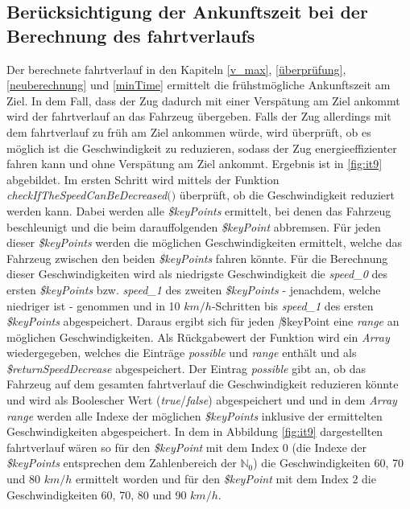 \subsection{Berücksichtigung der Ankunftszeit bei der Berechnung des \Gls{fahrtverlauf}s} \label{time}
Der berechnete \Gls{fahrtverlauf} in den Kapiteln \ref{v_max}, \ref{überprüfung}, \ref{neuberechnung} und \ref{minTime} ermittelt die frühstmögliche Ankunftszeit am Ziel. In dem Fall, dass der Zug dadurch mit einer Verspätung am Ziel ankommt wird der \Gls{fahrtverlauf} an das Fahrzeug übergeben. Falls der Zug allerdings mit dem \Gls{fahrtverlauf} zu früh am Ziel ankommen würde, wird überprüft, ob es möglich ist die Geschwindigkeit zu reduzieren, sodass der Zug energieeffizienter fahren kann und ohne Verspätung am Ziel ankommt.
Ergebnis ist in \ref{fig:it9} abgebildet.
Im ersten Schritt wird mittels der Funktion \textit{checkIfTheSpeedCanBeDecreased$($$)$} überprüft, ob die Geschwindigkeit reduziert werden kann. Dabei werden alle \textit{\$keyPoints} ermittelt, bei denen das Fahrzeug beschleunigt und die beim darauffolgenden \textit{\$keyPoint} abbremsen. Für jeden dieser \textit{\$keyPoints} werden die möglichen Geschwindigkeiten ermittelt, welche das Fahrzeug zwischen den beiden \textit{\$keyPoints} fahren könnte. Für die Berechnung dieser Geschwindigkeiten wird als niedrigste Geschwindigkeit die \textit{speed\_0} des ersten \textit{\$keyPoints} bzw. \textit{speed\_1} des zweiten \textit{\$keyPoints} - jenachdem, welche niedriger ist - genommen und in 10 $km/h$-Schritten bis  \textit{speed\_1} des ersten \textit{\$keyPoints} abgespeichert. Daraus ergibt sich für jeden \textit|{\$keyPoint} eine \textit{range} an möglichen Geschwindigkeiten. Als Rückgabewert der Funktion wird ein \textit{Array} wiedergegeben, welches die Einträge \textit{possible} und \textit{range} enthält und als \textit{\$returnSpeedDecrease} abgespeichert. Der Eintrag \textit{possible} gibt an, ob das Fahrzeug auf dem gesamten \Gls{fahrtverlauf} die Geschwindigkeit reduzieren könnte und wird als Boolescher Wert (\textit{true}/\textit{false}) abgespeichert und und in dem \textit{Array} \textit{range} werden alle Indexe der möglichen \textit{\$keyPoints} inklusive der ermittelten Geschwindigkeiten abgespeichert.
In dem in Abbildung \ref{fig:it9} dargestellten \Gls{fahrtverlauf} wären so für den \textit{\$keyPoint} mit dem Index 0 (die Indexe der \textit{\$keyPoints} entsprechen dem Zahlenbereich der $\mathbb{N}_0$) die Geschwindigkeiten 60, 70 und 80 $km/h$ ermittelt worden und für den \textit{\$keyPoint} mit dem Index $2$ die Geschwindigkeiten 60, 70, 80 und 90 $km/h$.
